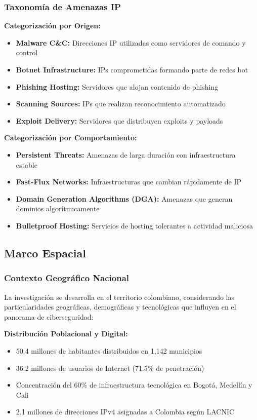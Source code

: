 \subsubsection{Taxonomía de Amenazas IP}

\textbf{Categorización por Origen:}
\begin{itemize}
    \item \textbf{Malware C\&C:} Direcciones IP utilizadas como servidores de comando y control
    \item \textbf{Botnet Infrastructure:} IPs comprometidas formando parte de redes bot
    \item \textbf{Phishing Hosting:} Servidores que alojan contenido de phishing
    \item \textbf{Scanning Sources:} IPs que realizan reconocimiento automatizado
    \item \textbf{Exploit Delivery:} Servidores que distribuyen exploits y payloads
\end{itemize}

\textbf{Categorización por Comportamiento:}
\begin{itemize}
    \item \textbf{Persistent Threats:} Amenazas de larga duración con infraestructura estable
    \item \textbf{Fast-Flux Networks:} Infraestructuras que cambian rápidamente de IP
    \item \textbf{Domain Generation Algorithms (DGA):} Amenazas que generan dominios algorítmicamente
    \item \textbf{Bulletproof Hosting:} Servicios de hosting tolerantes a actividad maliciosa
\end{itemize}

\subsection{Marco Espacial}

\subsubsection{Contexto Geográfico Nacional}
La investigación se desarrolla en el territorio colombiano, considerando las particularidades geográficas, demográficas y tecnológicas que influyen en el panorama de ciberseguridad:

\textbf{Distribución Poblacional y Digital:}
\begin{itemize}
    \item 50.4 millones de habitantes distribuidos en 1,142 municipios
    \item 36.2 millones de usuarios de Internet (71.5\% de penetración)
    \item Concentración del 60\% de infraestructura tecnológica en Bogotá, Medellín y Cali
    \item 2.1 millones de direcciones IPv4 asignadas a Colombia según LACNIC
\end{itemize}

